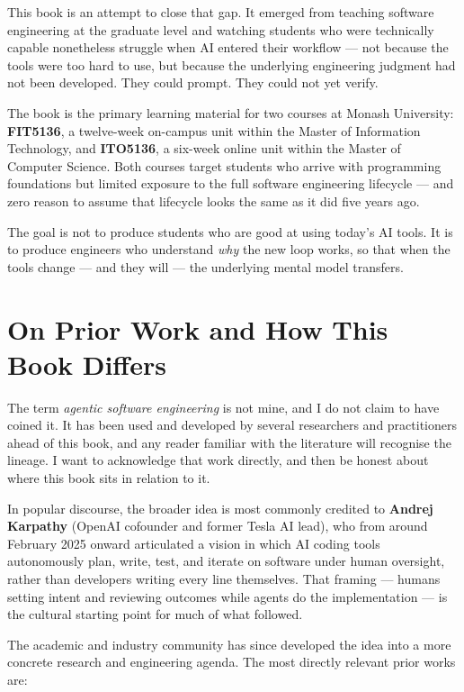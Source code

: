 \documentclass[11pt,a4paper]{book}
\begin{document}
This book is an attempt to close that gap. It emerged from teaching software engineering at the graduate level and watching students who were technically capable nonetheless struggle when AI entered their workflow --- not because the tools were too hard to use, but because the underlying engineering judgment had not been developed. They could prompt. They could not yet verify.

The book is the primary learning material for two courses at Monash University: \textbf{FIT5136}, a twelve-week on-campus unit within the Master of Information Technology, and \textbf{ITO5136}, a six-week online unit within the Master of Computer Science. Both courses target students who arrive with programming foundations but limited exposure to the full software engineering lifecycle --- and zero reason to assume that lifecycle looks the same as it did five years ago.

The goal is not to produce students who are good at using today's AI tools. It is to produce engineers who understand \textit{why} the new loop works, so that when the tools change --- and they will --- the underlying mental model transfers.

\medskip

\section{On Prior Work and How This Book Differs}

The term \textit{agentic software engineering} is not mine, and I do not claim to have coined it. It has been used and developed by several researchers and practitioners ahead of this book, and any reader familiar with the literature will recognise the lineage. I want to acknowledge that work directly, and then be honest about where this book sits in relation to it.

In popular discourse, the broader idea is most commonly credited to \textbf{Andrej Karpathy} (OpenAI cofounder and former Tesla AI lead), who from around February 2025 onward articulated a vision in which AI coding tools autonomously plan, write, test, and iterate on software under human oversight, rather than developers writing every line themselves. That framing --- humans setting intent and reviewing outcomes while agents do the implementation --- is the cultural starting point for much of what followed.

The academic and industry community has since developed the idea into a more concrete research and engineering agenda. The most directly relevant prior works are:
\end{document}
